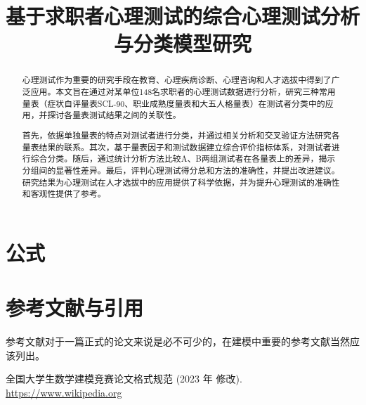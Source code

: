 \documentclass[withoutpreface,bwprint]{cumcmthesis} %
\title{基于求职者心理测试的综合心理测试分析与分类模型研究}
\begin{document}
 \maketitle
 \begin{abstract}
    心理测试作为重要的研究手段在教育、心理疾病诊断、心理咨询和人才选拔中得到了广泛应用。本文旨在通过对某单位148名求职者的心理测试数据进行分析，研究三种常用量表（症状自评量表SCL-90、职业成熟度量表和大五人格量表）在测试者分类中的应用，并探讨各量表测试结果之间的关联性。
    
    首先，依据单独量表的特点对测试者进行分类，并通过相关分析和交叉验证方法研究各量表结果的联系。其次，基于量表因子和测试数据建立综合评价指标体系，对测试者进行综合分类。随后，通过统计分析方法比较A、B两组测试者在各量表上的差异，揭示分组间的显著性差异。最后，评判心理测试得分总和方法的准确性，并提出改进建议。研究结果为心理测试在人才选拔中的应用提供了科学依据，并为提升心理测试的准确性和客观性提供了参考。

\end{abstract}



\section{公式}
\section{参考文献与引用}

参考文献对于一篇正式的论文来说是必不可少的，在建模中重要的参考文献当然应该列出。

\begin{thebibliography}{9}%
        全国大学生数学建模竞赛论文格式规范 (2023 年 修改).
     \url{https://www.wikipedia.org}
\end{thebibliography}
\end{document}

